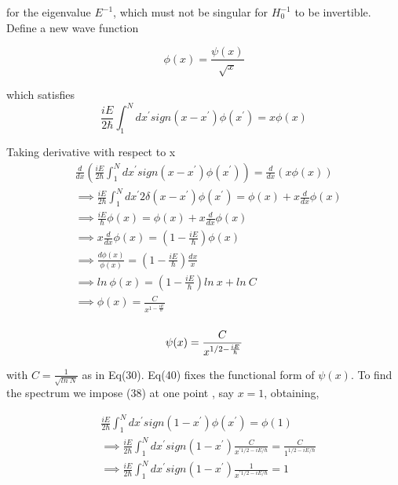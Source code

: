 \documentclass[12pt, letterpaper]{article}
\newcommand*{\1}{\hspace{1pt}}
\begin{document}
        for the eigenvalue $E^{-1}$, which must not be singular for $H_{0}^{-1}$ to be invertible. Define a new wave function 
    
        \begin{equation}
            \phi (x) = \frac{\psi (x)}{\sqrt{x}}
        \end{equation}

        which satisfies 
        \begin{equation}
            \frac{iE}{2\hbar} \int _{1}^{N} dx^{'}sign(x-x^{'})\phi(x^{'})= x\phi(x)
        \end{equation}

        Taking derivative with respect to x 
        \begin{equation}
            \begin{split}
                &\frac{d}{dx}\left(\frac{iE}{2\hbar} \int _{1}^{N} dx^{'}sign(x-x^{'})\phi(x^{'})\right)= \frac{d}{dx}\left( x\phi(x) \right) \\ 
                &\implies \frac{iE}{2\hbar} \int _{1}^{N} dx^{'}2\delta(x-x^{'})\phi(x^{'}) = \phi(x) + x \frac{d}{dx} \phi(x)  \\
                &\implies \frac{iE}{\hbar} \phi(x) = \phi(x) + x \frac{d}{dx} \phi(x)  \\
                &\implies x \frac{d}{dx} \phi(x) = \left(1 - \frac{iE}{\hbar}\right) \phi(x)   \\
                &\implies \frac{d\phi(x)}{\phi(x)} = \left(1 - \frac{iE}{\hbar}\right) \frac{dx}{x}   \\
                &\implies ln \ \phi(x) = \left(1 - \frac{iE}{\hbar}\right) ln \ x + ln \ C   \\
                &\implies \phi(x) = \frac{C}{x^{1 - \frac{iE}{\hbar}}}    \\
            \end{split}
        \end{equation}

        \begin{equation}
            \psi(x) = \frac{C}{x^{1/2 - \frac{iE}{\hbar}}}    \\
        \end{equation}

        with $C=\frac{1}{\sqrt{ln \  N}}$ as in Eq(30). Eq(40) fixes the functional form of $\psi(x)$. To find the spectrum we impose (38) at one point , say $x=1$, 
        obtaining,

        \begin{equation}
            \begin{split}
                &\frac{iE}{2\hbar} \int _{1}^{N} dx^{'} sign(1-x^{'}) \phi(x^{'}) = \phi(1) \\ 
                & \implies \frac{iE}{2\hbar} \int _{1}^{N} dx^{'} sign(1-x^{'}) \frac{C}{x^{' 1/2 - iE/\hbar}} = \frac{C}{1^{1/2 - iE/\hbar}} \\
                & \implies \frac{iE}{2\hbar} \int _{1}^{N} dx^{'} sign(1-x^{'}) \frac{1}{x^{' 1/2 - iE/\hbar}} = 1\\
            \end{split}
        \end{equation}
\end{document}
